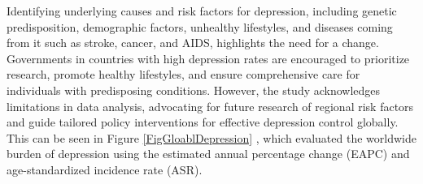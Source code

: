 Identifying underlying causes and risk factors for depression, including genetic predisposition, demographic factors, unhealthy lifestyles, and diseases coming from it such as stroke, cancer, and AIDS, highlights the need for a change. Governments in countries with high depression rates are encouraged to prioritize research, promote healthy lifestyles, and ensure comprehensive care for individuals with predisposing conditions. However, the study acknowledges limitations in data analysis, advocating for future research of regional risk factors and guide tailored policy interventions for effective depression control globally. This can be seen in Figure \ref{FigGloablDepression} \cite{liu2020changes}, which evaluated the worldwide burden of depression using the estimated annual percentage change (EAPC) and age-standardized incidence rate (ASR).

